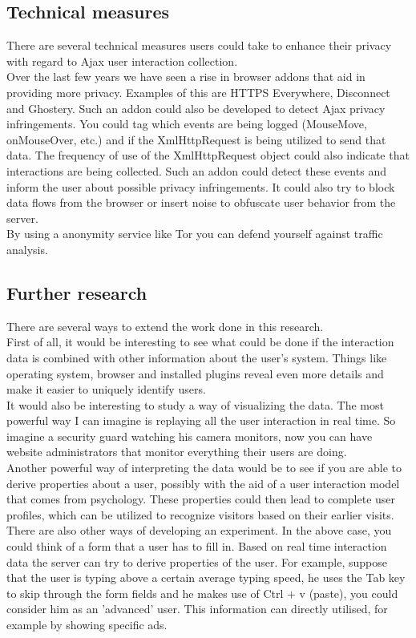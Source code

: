 \subsection{Technical measures}
There are several technical measures users could take to enhance their privacy with regard to Ajax user interaction collection.\\

Over the last few years we have seen a rise in browser addons that aid in providing more privacy. Examples of this are HTTPS Everywhere, Disconnect and Ghostery. Such an addon could also be developed to detect Ajax privacy infringements. You could tag which events are being logged (MouseMove, onMouseOver, etc.) and if the XmlHttpRequest is being utilized to send that data. The frequency of use of the XmlHttpRequest object could also indicate that interactions are being collected. Such an addon could detect these events and inform the user about possible privacy infringements. It could also try to block data flows from the browser or insert noise to obfuscate user behavior from the server.\\

By using a anonymity service like Tor you can defend yourself against traffic analysis.\\

\subsection{Further research}
There are several ways to extend the work done in this research. \\

First of all, it would be interesting to see what could be done if the interaction data is combined with other information about the user's system. Things like operating system, browser and installed plugins reveal even more details and make it easier to uniquely identify users. \\

It would also be interesting to study a way of visualizing the data. The most powerful way I can imagine is replaying all the user interaction in real time. So imagine a security guard watching his camera monitors, now you can have website administrators that monitor everything their users are doing. \\

Another powerful way of interpreting the data would be to see if you are able to derive properties about a user, possibly with the aid of a user interaction model that comes from psychology. These properties could then lead to complete user profiles, which can be utilized to recognize visitors based on their earlier visits.\\

There are also other ways of developing an experiment. In the above case, you could think of a form that a user has to fill in. Based on real time interaction data the server can try to derive properties of the user. For example, suppose that the user is typing above a certain average typing speed, he uses the Tab key to skip through the form fields and he makes use of Ctrl + v (paste), you could consider him as an 'advanced' user. This information can directly utilised, for example by showing specific ads.